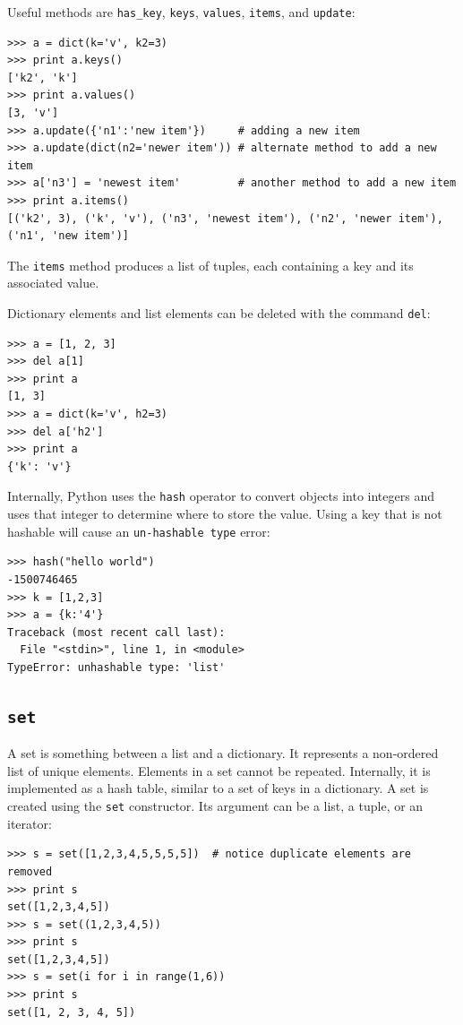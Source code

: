 \documentclass[justified,sixbynine]{tufte-book}
\def\ft{\small\tt}
\theoremstyle{plain}%
\theoremstyle{definition}
\theoremstyle{remark}
\begin{document}
\begin{fullwidth}
Useful methods are {\ft has\_key}, {\ft keys}, {\ft values}, {\ft items}, and {\ft update}:
\begin{lstlisting}
>>> a = dict(k='v', k2=3)
>>> print a.keys()
['k2', 'k']
>>> print a.values()
[3, 'v']
>>> a.update({'n1':'new item'})     # adding a new item
>>> a.update(dict(n2='newer item')) # alternate method to add a new item
>>> a['n3'] = 'newest item'         # another method to add a new item
>>> print a.items()
[('k2', 3), ('k', 'v'), ('n3', 'newest item'), ('n2', 'newer item'), ('n1', 'new item')]
\end{lstlisting}

The {\ft items} method produces a list of tuples, each containing a key and its associated value.

Dictionary elements and list elements can be deleted with the command {\ft del}:
\begin{lstlisting}
>>> a = [1, 2, 3]
>>> del a[1]
>>> print a
[1, 3]
>>> a = dict(k='v', h2=3)
>>> del a['h2']
>>> print a
{'k': 'v'}
\end{lstlisting}

Internally, Python uses the {\ft hash} operator to convert objects into integers and uses that integer to determine where to store the value.  Using a key that is not hashable will cause an {\ft un-hashable type} error:
\begin{lstlisting}
>>> hash("hello world")
-1500746465
>>> k = [1,2,3]
>>> a = {k:'4'}
Traceback (most recent call last):
  File "<stdin>", line 1, in <module>
TypeError: unhashable type: 'list'
\end{lstlisting}

\goodbreak\subsection{{\ft set}}


A set is something between a list and a dictionary. It represents a non-ordered list of unique elements.  Elements in a set cannot be repeated.  Internally, it is implemented as a hash table, similar to a set of keys in a dictionary.  A set is created using the {\ft set} constructor.  Its argument can be a list, a tuple, or an iterator:

\begin{lstlisting}
>>> s = set([1,2,3,4,5,5,5,5])  # notice duplicate elements are removed
>>> print s
set([1,2,3,4,5])
>>> s = set((1,2,3,4,5))
>>> print s
set([1,2,3,4,5])
>>> s = set(i for i in range(1,6))
>>> print s
set([1, 2, 3, 4, 5])
\end{lstlisting}


\end{fullwidth}
\end{document}
